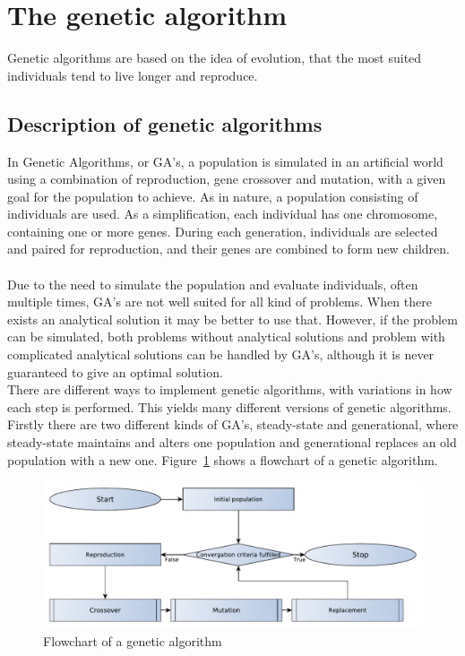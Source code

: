 \pagebreak
\section{The genetic algorithm}
Genetic algorithms are based on the idea of evolution, that the most suited individuals tend to live longer and reproduce. 

\subsection{Description of genetic algorithms}
In Genetic Algorithms, or GA's, a population is simulated in an artificial world using a combination of reproduction, gene crossover and mutation, with a given goal for the population to achieve. As in nature, a population consisting of individuals are used. As a simplification, each individual has one chromosome, containing one or more genes. During each generation, individuals are selected and paired for reproduction, and their genes are combined to form new children.\\
\\
Due to the need to simulate the population and evaluate individuals, often multiple times, GA's are not well suited for all kind of problems. When there exists an analytical solution it may be better to use that. However, if the problem can be simulated, both problems without analytical solutions and problem with complicated analytical solutions can be handled by GA's, although it is never guaranteed to give an optimal solution.\\
There are different ways to implement genetic algorithms, with variations in how each step is performed. This yields many different versions of genetic algorithms. Firstly there are two different kinds of GA's, steady-state and generational, where steady-state maintains and alters one population and generational replaces an old population with a new one.
Figure~\ref{GeneticFlowChart1} shows a flowchart of a genetic algorithm.
\begin{figure}[!h]
	\centering
	\includegraphics[width=\textwidth]{chapter_4_methods/GeneticFlowChart-Generic}
  	\caption[Flowchart of a genetic algorithm]
  	{Flowchart of a genetic algorithm}
	\label{GeneticFlowChart1}
\end{figure}
